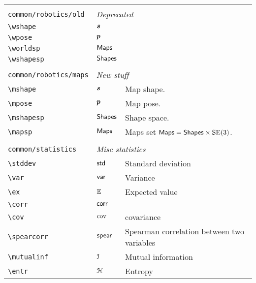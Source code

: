 \begin{longtable}{lll}
  &  & \\ 
 {\color[rgb]{0.5,0.5,0.5}\texttt{common/robotics/old}} & \multicolumn{2}{l}{\emph{Deprecated}}\\ 
 \hline
{\color[rgb]{0.5,0.5,0.5}\texttt{\textbackslash wshape}} & $\boldsymbol{s}$ & \\ 
 {\color[rgb]{0.5,0.5,0.5}\texttt{\textbackslash wpose}} & $\boldsymbol{p}$ & \\ 
 {\color[rgb]{0.5,0.5,0.5}\texttt{\textbackslash worldsp}} & $\mathsf{Maps}$ & \\ 
 {\color[rgb]{0.5,0.5,0.5}\texttt{\textbackslash wshapesp}} & $\mathsf{Shapes}$ & \\ 
  &  & \\ 
 {\color[rgb]{0.5,0.5,0.5}\texttt{common/robotics/maps}} & \multicolumn{2}{l}{\emph{New stuff}}\\ 
 \hline
{\color[rgb]{0.5,0.5,0.5}\texttt{\textbackslash mshape}} & $\boldsymbol{s}$ &  Map shape.\\ 
 {\color[rgb]{0.5,0.5,0.5}\texttt{\textbackslash mpose}} & $\boldsymbol{p}$ &  Map pose.\\ 
 {\color[rgb]{0.5,0.5,0.5}\texttt{\textbackslash mshapesp}} & $\mathsf{Shapes}$ &  Shape space.\\ 
 {\color[rgb]{0.5,0.5,0.5}\texttt{\textbackslash mapsp}} & $\mathsf{Maps}$ &  Maps set $\mathsf{Maps} = \mathsf{Shapes} \times \mathrm{SE(3)}$.\\ 
  &  & \\ 
 {\color[rgb]{0.5,0.5,0.5}\texttt{common/statistics}} & \multicolumn{2}{l}{\emph{Misc statistics}}\\ 
 \hline
{\color[rgb]{0.5,0.5,0.5}\texttt{\textbackslash stddev}} & $\mathsf{std}$ &  Standard deviation\\ 
 {\color[rgb]{0.5,0.5,0.5}\texttt{\textbackslash var}} & $\mathsf{var}$ &  Variance\\ 
 {\color[rgb]{0.5,0.5,0.5}\texttt{\textbackslash ex}} & $\mathbb{E}$ &  Expected value\\ 
 {\color[rgb]{0.5,0.5,0.5}\texttt{\textbackslash corr}} & $\mathsf{corr}$ & \\ 
 {\color[rgb]{0.5,0.5,0.5}\texttt{\textbackslash cov}} & $\mathrm{cov}$ &  covariance\\ 
 {\color[rgb]{0.5,0.5,0.5}\texttt{\textbackslash spearcorr}} & $\mathsf{spear}$ &  Spearman correlation between two variables\\ 
 {\color[rgb]{0.5,0.5,0.5}\texttt{\textbackslash mutualinf}} & $\mathcal{I}$ &  Mutual information\\ 
 {\color[rgb]{0.5,0.5,0.5}\texttt{\textbackslash entr}} & $\mathcal{H}$ &  Entropy\\ 

\end{longtable}

